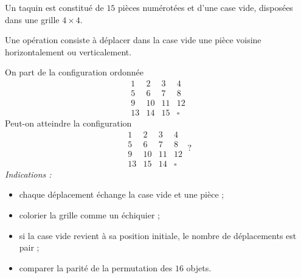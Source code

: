 Un taquin est constitué de $15$ pièces numérotées et d'une case vide,
disposées dans une grille $4 \times 4$.

Une opération consiste à déplacer dans la case vide une pièce voisine
horizontalement ou verticalement.

On part de la configuration ordonnée
\[
\begin{array}{cccc}
1 & 2 & 3 & 4 \\
5 & 6 & 7 & 8 \\
9 & 10 & 11 & 12 \\
13 & 14 & 15 & \square
\end{array}
\]
Peut-on atteindre la configuration
\[
\begin{array}{cccc}
1 & 2 & 3 & 4 \\
5 & 6 & 7 & 8 \\
9 & 10 & 11 & 12 \\
13 & 15 & 14 & \square
\end{array}
\ ?
\]
\emph{Indications :}
\begin{itemize}
  \item chaque déplacement échange la case vide et une pièce ;
  \item colorier la grille comme un échiquier ;
  \item si la case vide revient à sa position initiale, le nombre de
  déplacements est pair ;
  \item comparer la parité de la permutation des $16$ objets.
\end{itemize}
